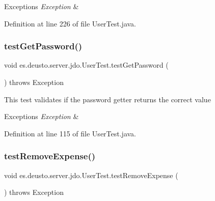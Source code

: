 \begin{DoxyExceptions}{Exceptions}
{\em Exception} & \\
\hline
\end{DoxyExceptions}


Definition at line 226 of file User\+Test.\+java.

\mbox{\label{classes_1_1deusto_1_1server_1_1jdo_1_1_user_test_a81ad692662774db5d47e857d45320e2b}} 
\subsubsection{\texorpdfstring{test\+Get\+Password()}{testGetPassword()}}
{\footnotesize\ttfamily void es.\+deusto.\+server.\+jdo.\+User\+Test.\+test\+Get\+Password (\begin{DoxyParamCaption}{ }\end{DoxyParamCaption}) throws Exception}

This test validates if the password getter returns the correct value 
\begin{DoxyExceptions}{Exceptions}
{\em Exception} & \\
\hline
\end{DoxyExceptions}


Definition at line 115 of file User\+Test.\+java.

\mbox{\label{classes_1_1deusto_1_1server_1_1jdo_1_1_user_test_acc8ecd1dc930429a2247c34047f4b66d}} 
\subsubsection{\texorpdfstring{test\+Remove\+Expense()}{testRemoveExpense()}}
{\footnotesize\ttfamily void es.\+deusto.\+server.\+jdo.\+User\+Test.\+test\+Remove\+Expense (\begin{DoxyParamCaption}{ }\end{DoxyParamCaption}) throws Exception}

